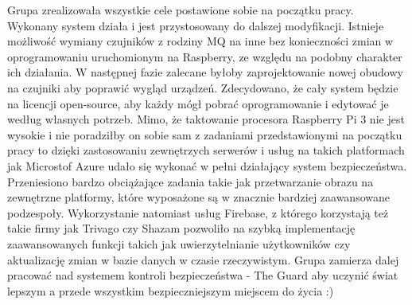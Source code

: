 Grupa zrealizowała wszystkie cele postawione sobie na początku pracy. Wykonany system działa i jest przystosowany do dalszej modyfikacji. Istnieje możliwość wymiany czujników z rodziny MQ na inne bez konieczności zmian w oprogramowaniu uruchomionym na Raspberry, ze względu na podobny charakter ich działania. W następnej fazie zalecane byłoby zaprojektowanie nowej obudowy na czujniki aby poprawić wygląd urządzeń. Zdecydowano, że cały system będzie na licencji open-source, aby każdy mógł pobrać oprogramowanie i edytować je według własnych potrzeb. Mimo, że taktowanie procesora Raspberry Pi 3 nie jest wysokie i nie poradziłby on sobie sam z zadaniami przedstawionymi na początku pracy to dzięki zastosowaniu zewnętrzych serwerów i usług na takich platformach jak Microstof Azure udało się wykonać w pełni działający system bezpieczeństwa. Przeniesiono bardzo obciążające zadania takie jak przetwarzanie obrazu na zewnętrzne platformy, które wyposażone są w znacznie bardziej zaawansowane podzespoły. Wykorzystanie natomiast usług Firebase, z którego korzystają też takie firmy jak Trivago czy Shazam pozwoliło na szybką implementację zaawansowanych funkcji takich jak uwierzytelnianie użytkowników czy aktualizację zmian w bazie danych w czasie rzeczywistym. Grupa zamierza dalej pracować nad systemem kontroli bezpieczeństwa - The Guard aby uczynić świat lepszym a przede wszystkim bezpieczniejszym miejscem do życia :)